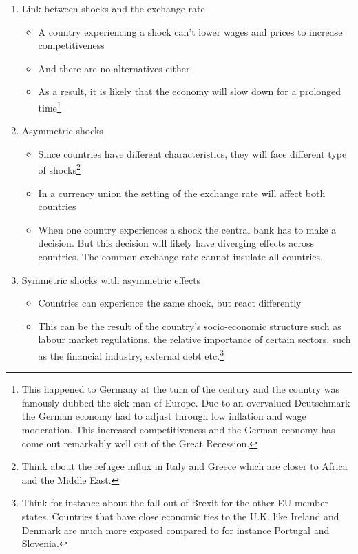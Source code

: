 \documentclass{tufte-handout}
\begin{document}
\begin{enumerate}
	\item Link between shocks and the exchange rate
	\begin{itemize}
	  \item A country experiencing a shock can't lower wages and prices to increase competitiveness
	  \item And there are no alternatives either
	  \item As a result, it is likely that the economy will slow down for a prolonged time\footnote{This happened to Germany at the turn of the century and the country was famously dubbed the sick man of Europe. Due to an overvalued Deutschmark the German economy had to adjust through low inflation and wage moderation. This increased competitiveness and the German economy has come out remarkably well out of the Great Recession.}
	\end{itemize}

	\item Asymmetric shocks
	\begin{itemize}
	  \item Since countries have different characteristics, they will face different type of shocks\footnote{Think about the refugee influx in Italy and Greece which are closer to Africa and the Middle East.}
	  \item In a currency union the setting of the exchange rate will affect both countries 
	  \item When one country experiences a shock the central bank has to make a decision. But this decision will likely have diverging effects across countries. The common exchange rate cannot insulate all countries. 
	\end{itemize}	
	\item Symmetric shocks with asymmetric effects
	\begin{itemize}
	  \item Countries can experience the same shock, but react differently
	  \item This can be the result of the country's socio-economic structure such as labour market regulations, the relative importance of certain sectors, such as the financial industry, external debt etc.\footnote{Think for instance about the fall out of Brexit for the other EU member states. Countries that have close economic ties to the U.K. like Ireland and Denmark are much more exposed compared to for instance Portugal and Slovenia.} 
	\end{itemize}
\end{enumerate}
\end{document}
